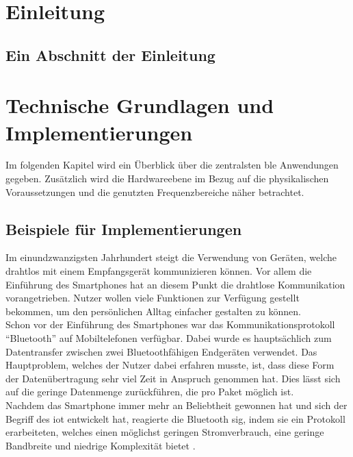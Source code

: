 \section{Einleitung}
\label{s:intro}


\subsection{Ein Abschnitt der Einleitung}
\label{ss:intro:abc}

\section{Technische Grundlagen und Implementierungen}
\label{s:grundlagen}

Im folgenden Kapitel wird ein Überblick über die zentralsten \ac{ble} Anwendungen gegeben. Zusätzlich wird die Hardwareebene im Bezug auf die physikalischen Voraussetzungen und die genutzten Frequenzbereiche näher betrachtet. 

\subsection{Beispiele für Implementierungen}
\label{ss:grundlagen:beispiele}

Im einundzwanzigsten Jahrhundert steigt die Verwendung von Geräten, welche drahtlos mit einem Empfangsgerät kommunizieren können. Vor allem die Einführung des Smartphones hat an diesem Punkt die drahtlose Kommunikation vorangetrieben. Nutzer wollen viele Funktionen zur Verfügung gestellt bekommen, um den persönlichen Alltag einfacher gestalten zu können.\\

\noindent Schon vor der Einführung des Smartphones war das Kommunikationsprotokoll "`Bluetooth"' auf Mobiltelefonen verfügbar. Dabei wurde es hauptsächlich zum Datentransfer zwischen zwei Bluetoothfähigen Endgeräten verwendet. Das Hauptproblem, welches der Nutzer dabei erfahren musste, ist, dass diese Form der Datenübertragung sehr viel Zeit in Anspruch genommen hat. Dies lässt sich auf die geringe Datenmenge zurückführen, die pro Paket möglich ist.\\

\noindent Nachdem das Smartphone immer mehr an Beliebtheit gewonnen hat und sich der Begriff des \ac{iot} entwickelt hat, reagierte die Bluetooth \ac{sig}, indem sie ein Protokoll erarbeiteten, welches einen möglichst geringen Stromverbrauch, eine geringe Bandbreite und niedrige Komplexität bietet \cite[Seite 1]{Townsend14:GSB}.\\

